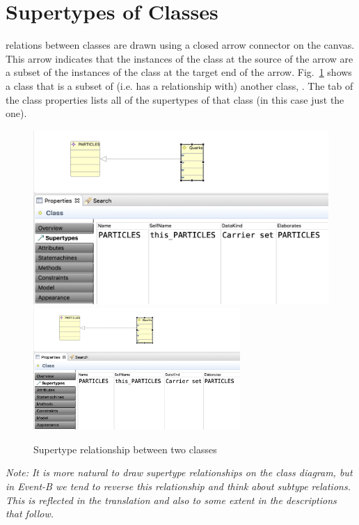 \section{Supertypes of Classes}
\label{sec:classdiagrams-supertypes}

 relations between classes are drawn using a closed arrow connector on the canvas.
This arrow indicates that the instances of the class at the source of the arrow are a subset of the instances of the class at the target end of the arrow.
Fig.~\ref{fig:ClassSupertypeSimple} shows a class  that is a subset of (i.e. has a  relationship with) another class, .
The  tab of the class properties lists all of the supertypes  of that class (in this case just the one).


\begin{figure}[!htbp]
	\centering
	\ifplastex
	\includegraphics[width=700]{figures/ClassSupertypeSimple.png}
	\else
	\includegraphics[width=0.7\textwidth]{figures/ClassSupertypeSimple.png}
	\fi
	\caption{Supertype relationship between two classes}
	\label{fig:ClassSupertypeSimple}
\end{figure}

 
\emph{Note: It is more natural to draw supertype relationships on the class diagram, but in Event-B we tend to reverse this relationship and think about subtype relations.
	This is reflected in the translation and also to some extent in the descriptions that follow.}

